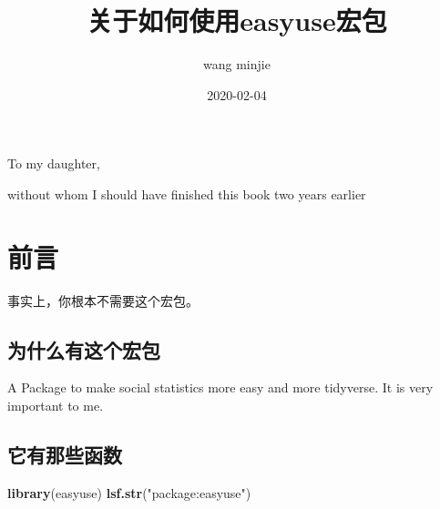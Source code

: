 \documentclass[
]{krantz}
\title{关于如何使用easyuse宏包}
\author{wang minjie}
\date{2020-02-04}
\makeatletter
\newenvironment{Shaded}{\begin{snugshade}}{\end{snugshade}}
\newcommand{\KeywordTok}[1]{\textcolor[rgb]{0.27,0.27,0.27}{\textbf{#1}}}
\newcommand{\NormalTok}[1]{#1}
\newcommand{\StringTok}[1]{\textcolor[rgb]{0.5,0.5,0.5}{#1}}
\newenvironment{kframe}{%
\medskip{}
\setlength{\fboxsep}{.8em}
 \def\at@end@of@kframe{}%
 \ifinner\ifhmode%
  \def\at@end@of@kframe{\end{minipage}}%
  \begin{minipage}{\columnwidth}%
 \fi\fi%
 \def\FrameCommand##1{\hskip\@totalleftmargin \hskip-\fboxsep
 \colorbox{shadecolor}{##1}\hskip-\fboxsep
     \hskip-\linewidth \hskip-\@totalleftmargin \hskip\columnwidth}%
 \MakeFramed {\advance\hsize-\width
   \@totalleftmargin\z@ \linewidth\hsize
   \@setminipage}}%
 {\par\unskip\endMakeFramed%
 \at@end@of@kframe}
\renewenvironment{Shaded}{\begin{kframe}}{\end{kframe}}
\makeatother
\begin{document}
\maketitle


\thispagestyle{empty}

\begin{center}
To my daughter,

without whom I should have finished this book two years earlier
\end{center}

\setlength{\abovedisplayskip}{-5pt}
\setlength{\abovedisplayshortskip}{-5pt}

{
\hypersetup{linkcolor=}
\setcounter{tocdepth}{2}
\tableofcontents
}
\listoftables
\listoffigures
\hypertarget{ux524dux8a00}{%
\chapter*{前言}\label{ux524dux8a00}}


事实上，你根本不需要这个宏包。

\hypertarget{ux4e3aux4ec0ux4e48ux6709ux8fd9ux4e2aux5b8fux5305}{%
\section*{为什么有这个宏包}\label{ux4e3aux4ec0ux4e48ux6709ux8fd9ux4e2aux5b8fux5305}}


A Package to make social statistics more easy and more tidyverse. It is very important to me.

\hypertarget{ux5b83ux6709ux90a3ux4e9bux51fdux6570}{%
\section*{它有那些函数}\label{ux5b83ux6709ux90a3ux4e9bux51fdux6570}}


\begin{Shaded}
\begin{Highlighting}[]
\KeywordTok{library}\NormalTok{(easyuse)}
\KeywordTok{lsf.str}\NormalTok{(}\StringTok{"package:easyuse"}\NormalTok{)}
\end{Highlighting}
\end{Shaded}
\end{document}
